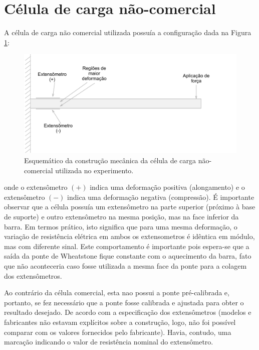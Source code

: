 \documentclass[a4paper]{instrumentacao}
\begin{document}

\section{Célula de carga não-comercial}

A célula de carga não comercial utilizada possuía a configuração dada na Figura \ref{fig:celula-nao-comercial-desenho}:

\begin{figure}[H]
\center
\includegraphics[width=\textwidth]{CelulaNaoComercial.pdf}
\caption{Esquemático da construção mecânica da célula de carga não-comercial utilizada no experimento.}
\label{fig:celula-nao-comercial-desenho}
\end{figure}

\noindent onde o extensômetro $(+)$ indica uma deformação positiva (alongamento) e o extensômetro $(-)$ indica uma deformação negativa (compressão). É importante observar que a célula possuía um extensômetro na parte superior (próximo à base de suporte) e outro extensômetro na mesma posição, mas na face inferior da barra. Em termos prático, isto significa que para uma mesma deformação, o variação de resistência elétrica em ambos os extensometros é idêntica em módulo, mas com diferente sinal. Este comportamento é importante pois espera-se que a saída da ponte de Wheatstone fique constante com o aquecimento da barra, fato que não aconteceria caso fosse utilizada a mesma face da ponte para a colagem dos extensômetros.

Ao contrário da célula comercial, esta nao possui a ponte pré-calibrada e, portanto, se fez necessário que a ponte fosse calibrada e ajustada para obter o resultado desejado. De acordo com a especificação dos extensômetros (modelos e fabricantes não estavam explícitos sobre a construção, logo, não foi possível comparar com os valores fornecidos pelo fabricante). Havia, contudo, uma marcação indicando o valor de resistência nominal do extensômetro.
\end{document}
